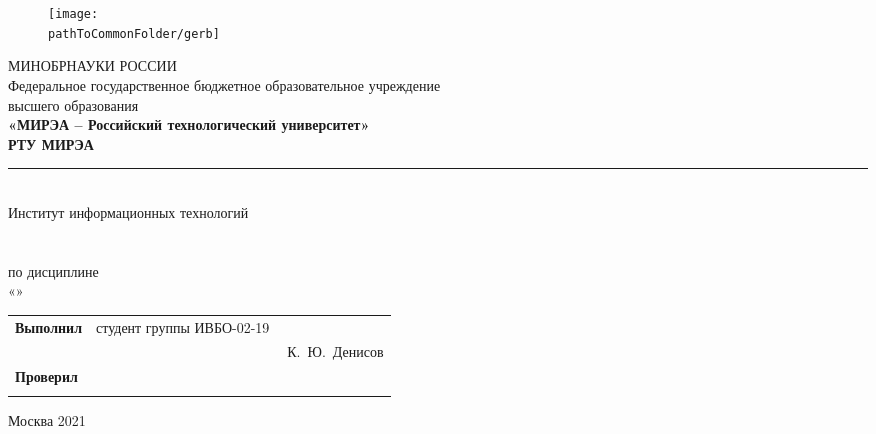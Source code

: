 
\begin{center}
	\begin{figure}[h!]
		\begin{center}
		\texttt{[image: \\pathToCommonFolder/gerb]}
		\end{center}	
	\end{figure}
 	\small	МИНОБРНАУКИ РОССИИ \\
	Федеральное государственное бюджетное образовательное учреждение\\
						высшего образования\\
\normalsize					
\textbf{«МИРЭА – Российский технологический университет»\\
						РТУ МИРЭА}\\
						\noindent\rule{1\linewidth}{2pt}\\
       Институт информационных технологий\\ %
					\kafedra\\
		\vspace{5ex}
			\large \textbf{\workname}  \\
		\vspace{2ex}
						по дисциплине\\ «\discipline» \\
		\vspace{3ex}
\vspace{6ex}
\small
\begin{table}[h!]
\begin{tabular}{lp{0.5\linewidth}l}
	\textbf{Выполнил} & студент группы ИВБО-02-19 & \\ 
	& & К.~Ю.~Денисов\\
	\textbf{Проверил} & \rang & \\
	& & \teacherfio\\
\end{tabular}
\end{table}

\normalsize
	
\vfill
Москва 2021

\end{center}